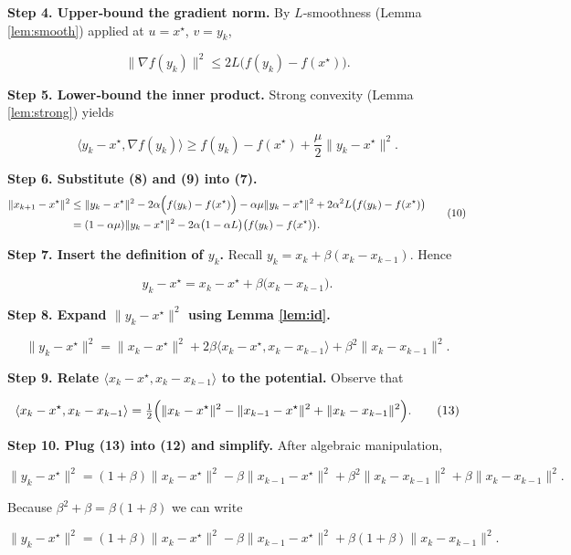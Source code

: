 \documentclass{article}
\begin{document}
\noindent\textbf{Step 4. Upper‑bound the gradient norm.}  
By $L$‑smoothness (Lemma \ref{lem:smooth}) applied at $u=x^{\star}$, $v=y_k$,

\[
\|\nabla f(y_k)\|^{2}\le 2L\bigl(f(y_k)-f(x^{\star})\bigr). \tag{8}
\]

\noindent\textbf{Step 5. Lower‑bound the inner product.}  
Strong convexity (Lemma \ref{lem:strong}) yields  

\[
\langle y_k-x^{\star},\nabla f(y_k)\rangle
\ge f(y_k)-f(x^{\star})+\frac{\mu}{2}\|y_k-x^{\star}\|^{2}. \tag{9}
\]

\noindent\textbf{Step 6. Substitute (8) and (9) into (7).}  
\[
\begin{aligned}
\|x_{k+1}-x^{\star}\|^{2}
&\le \|y_k-x^{\star}\|^{2}
   -2\alpha\Bigl(f(y_k)-f(x^{\star})\Bigr)
   -\alpha\mu\|y_k-x^{\star}\|^{2}
   +2\alpha^{2}L\bigl(f(y_k)-f(x^{\star})\bigr)\\
&= (1-\alpha\mu)\|y_k-x^{\star}\|^{2}
   -2\alpha\bigl(1-\alpha L\bigr)\bigl(f(y_k)-f(x^{\star})\bigr).
\end{aligned}
\tag{10}
\]

\noindent\textbf{Step 7. Insert the definition of $y_k$.}  
Recall $y_k = x_k+\beta(x_k-x_{k-1})$. Hence  

\[
y_k-x^{\star}=x_k-x^{\star}+\beta\bigl(x_k-x_{k-1}\bigr). \tag{11}
\]

\noindent\textbf{Step 8. Expand $\|y_k-x^{\star}\|^{2}$ using Lemma \ref{lem:id}.}  

\[
\|y_k-x^{\star}\|^{2}
= \|x_k-x^{\star}\|^{2}
  +2\beta\langle x_k-x^{\star},x_k-x_{k-1}\rangle
  +\beta^{2}\|x_k-x_{k-1}\|^{2}. \tag{12}
\]

\noindent\textbf{Step 9. Relate $\langle x_k-x^{\star},x_k-x_{k-1}\rangle$ to the potential.}  
Observe that  

\[
\langle x_k-x^{\star},x_k-x_{k-1}\rangle
= \tfrac12\Bigl(\|x_k-x^{\star}\|^{2}-\|x_{k-1}-x^{\star}\|^{2}
                +\|x_k-x_{k-1}\|^{2}\Bigr). \tag{13}
\]

\noindent\textbf{Step 10. Plug (13) into (12) and simplify.}  
After algebraic manipulation,

\[
\|y_k-x^{\star}\|^{2}
= (1+\beta)\|x_k-x^{\star}\|^{2}
  -\beta\|x_{k-1}-x^{\star}\|^{2}
  +\beta^{2}\|x_k-x_{k-1}\|^{2}
  +\beta\|x_k-x_{k-1}\|^{2}. \tag{14}
\]

Because $\beta^{2}+\beta=\beta(1+\beta)$ we can write  

\[
\|y_k-x^{\star}\|^{2}
= (1+\beta)\|x_k-x^{\star}\|^{2}
  -\beta\|x_{k-1}-x^{\star}\|^{2}
  +\beta(1+\beta)\|x_k-x_{k-1}\|^{2}. \tag{15}
\]
\end{document}
